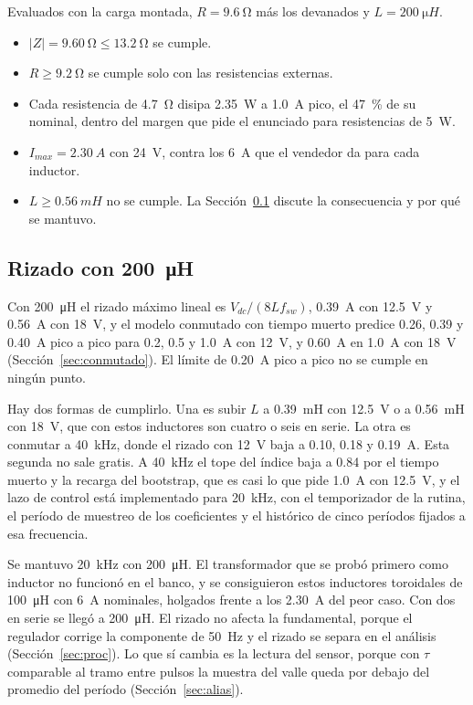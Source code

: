 \documentclass[journal]{IEEEtran}
\begin{document}
Evaluados con la carga montada, $R=\SI{9.6}{\ohm}$ más los devanados y $L=\SI{200}{\micro H}$.

\begin{itemize}
	\item $|Z|=\SI{9.60}{\ohm}\le\SI{13.2}{\ohm}$ se cumple.
	\item $R\ge\SI{9.2}{\ohm}$ se cumple solo con las resistencias externas.
	\item Cada resistencia de \SI{4.7}{\ohm} disipa \SI{2.35}{W} a \SI{1.0}{A} pico, el \SI{47}{\percent} de su nominal, dentro del margen que pide el enunciado para resistencias de \SI{5}{W}.
	\item $I_{max}=\SI{2.30}{A}$ con \SI{24}{V}, contra los \SI{6}{A} que el vendedor da para cada inductor.
	\item $L\ge\SI{0.56}{mH}$ no se cumple. La Sección~\ref{sec:rizado_just} discute la consecuencia y por qué se mantuvo.
\end{itemize}

\subsection{Rizado con \SI{200}{\micro H}}
\label{sec:rizado_just}
Con \SI{200}{\micro H} el rizado máximo lineal es $V_{dc}/(8Lf_{sw})$, \SI{0.39}{A} con \SI{12.5}{V} y \SI{0.56}{A} con \SI{18}{V}, y el modelo conmutado con tiempo muerto predice \num{0.26}, \num{0.39} y \SI{0.40}{A} pico a pico para \num{0.2}, \num{0.5} y \SI{1.0}{A} con \SI{12}{V}, y \SI{0.60}{A} en \SI{1.0}{A} con \SI{18}{V} (Sección~\ref{sec:conmutado}). El límite de \SI{0.20}{A} pico a pico no se cumple en ningún punto.

Hay dos formas de cumplirlo. Una es subir $L$ a \SI{0.39}{mH} con \SI{12.5}{V} o a \SI{0.56}{mH} con \SI{18}{V}, que con estos inductores son cuatro o seis en serie. La otra es conmutar a \SI{40}{kHz}, donde el rizado con \SI{12}{V} baja a \num{0.10}, \num{0.18} y \SI{0.19}{A}. Esta segunda no sale gratis. A \SI{40}{kHz} el tope del índice baja a \num{0.84} por el tiempo muerto y la recarga del bootstrap, que es casi lo que pide \SI{1.0}{A} con \SI{12.5}{V}, y el lazo de control está implementado para \SI{20}{kHz}, con el temporizador de la rutina, el período de muestreo de los coeficientes y el histórico de cinco períodos fijados a esa frecuencia.

Se mantuvo \SI{20}{kHz} con \SI{200}{\micro H}. El transformador que se probó primero como inductor no funcionó en el banco, y se consiguieron estos inductores toroidales de \SI{100}{\micro H} con \SI{6}{A} nominales, holgados frente a los \SI{2.30}{A} del peor caso. Con dos en serie se llegó a \SI{200}{\micro H}. El rizado no afecta la fundamental, porque el regulador corrige la componente de \SI{50}{Hz} y el rizado se separa en el análisis (Sección~\ref{sec:proc}). Lo que sí cambia es la lectura del sensor, porque con $\tau$ comparable al tramo entre pulsos la muestra del valle queda por debajo del promedio del período (Sección~\ref{sec:alias}).
\end{document}
